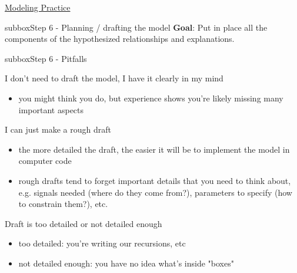 \begin{textbox}{\href{https://compneuro.neuromatch.io/projects/modelingsteps/ModelingSteps_5through10.html}{Modeling Practice  } }
\begin{subbox}{subbox}{Step 6 - Planning / drafting the model}
\textbf{Goal}: Put in place all the components of the hypothesized relationships and explanations.

  \end{subbox}
\begin{subbox}{subbox}{Step 6 - Pitfalls }
\scriptsize


I don't need to draft the model, I have it clearly in my mind
\begin{itemize}
    \item 

you might think you do, but experience shows you're likely missing many important aspects\end{itemize}

I can just make a rough draft
\begin{itemize}
    \item the more detailed the draft, the easier it will be to implement the model in computer code \item rough drafts tend to forget important details that you need to think about, e.g. signals needed (where do they come from?), parameters to specify (how to constrain them?), etc.\end{itemize}

Draft is too detailed or not detailed enough
\begin{itemize}
    \item too detailed: you're writing our recursions, etc \item not detailed enough: you have no idea what's inside "boxes"\end{itemize}
\end{subbox}
 
 
\end{textbox}

